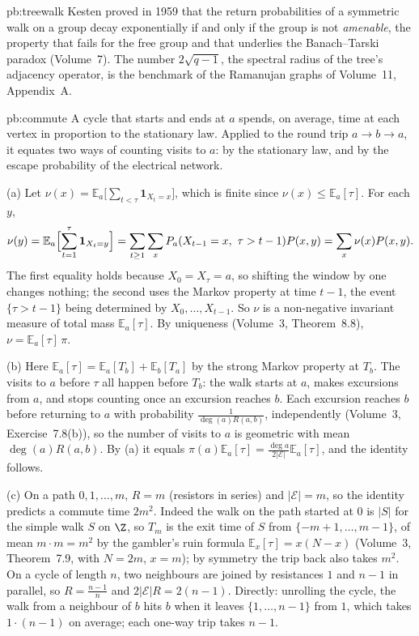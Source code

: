 \begin{solution}{pb:treewalk}
\leads Kesten proved in 1959 that the return probabilities of a symmetric walk on a group decay exponentially if and only if the group is
not \emph{amenable}, the property that fails for the free group and that underlies the Banach--Tarski paradox (Volume~7). The number
$2\sqrt{q-1}$, the spectral radius of the tree's adjacency operator, is the benchmark of the Ramanujan graphs of Volume~11, Appendix~A.
\end{solution}

\begin{solution}{pb:commute}
\idea A cycle that starts and ends at $a$ spends, on average, time at each vertex in proportion to the stationary law. Applied to the round
trip $a\to b\to a$, it equates two ways of counting visits to $a$: by the stationary law, and by the escape probability of the electrical
network.

\writeup (a) Let $\nu(x)=\mathbb E_a\bigl[\sum_{t<\tau}\mathbf 1_{X_t=x}\bigr]$, which is finite since $\nu(x)\le\mathbb E_a[\tau]$. For each $y$,
\[
\nu(y)=\mathbb E_a\Bigl[\sum_{t=1}^{\tau}\mathbf 1_{X_t=y}\Bigr]=\sum_{t\ge1}\sum_xP_a(X_{t-1}=x,\ \tau>t-1)P(x,y)=\sum_x\nu(x)P(x,y).
\]
The first equality holds because $X_0=X_\tau=a$, so shifting the window by one changes nothing; the second uses the Markov property at time $t-1$,
the event $\{\tau>t-1\}$ being determined by $X_0,\dots,X_{t-1}$. So $\nu$ is a non-negative invariant measure of total mass $\mathbb E_a[\tau]$. By uniqueness
(Volume~3, Theorem~8.8), $\nu=\mathbb E_a[\tau]\,\pi$.

(b) Here $\mathbb E_a[\tau]=\mathbb E_a[T_b]+\mathbb E_b[T_a]$ by the strong Markov property at $T_b$. The visits to $a$ before $\tau$ all happen before $T_b$: the walk starts at $a$,
makes excursions from $a$, and stops counting once an excursion reaches $b$. Each excursion reaches $b$ before returning to $a$ with
probability $\frac1{\deg(a)R(a,b)}$, independently (Volume~3, Exercise~7.8(b)), so the number of visits to $a$ is geometric with mean $\deg(a)R(a,b)$. By (a)
it equals $\pi(a)\mathbb E_a[\tau]=\frac{\deg a}{2|\mathcal E|}\mathbb E_a[\tau]$, and the identity follows.

(c) On a path $0,1,\dots,m$, $R=m$ (resistors in series) and $|\mathcal E|=m$, so the identity predicts a commute time $2m^2$. Indeed the walk on the path
started at $0$ is $|S|$ for the simple walk $S$ on $\Z$, so $T_m$ is the exit time of $S$ from $\{-m+1,\dots,m-1\}$, of mean $m\cdot m=m^2$ by the gambler's ruin formula
$\mathbb E_x[\tau]=x(N-x)$ (Volume~3, Theorem~7.9, with $N=2m$, $x=m$); by symmetry the trip back also takes $m^2$. On a cycle of length $n$, two neighbours are joined by
resistances $1$ and $n-1$ in parallel, so $R=\frac{n-1}n$ and $2|\mathcal E|R=2(n-1)$. Directly: unrolling the cycle, the walk from a neighbour of $b$ hits $b$ when it
leaves $\{1,\dots,n-1\}$ from $1$, which takes $1\cdot(n-1)$ on average; each one-way trip takes $n-1$.


\end{solution}
